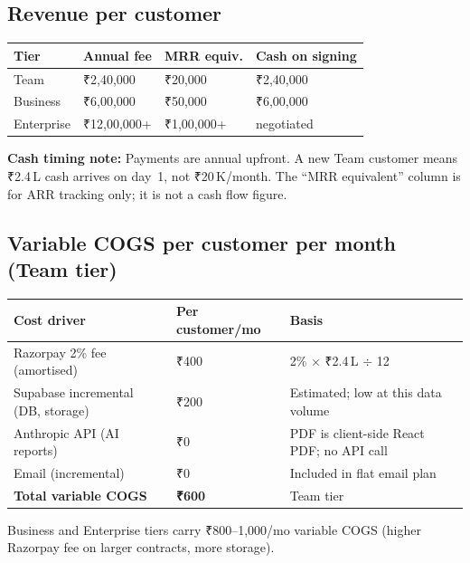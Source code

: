 \documentclass[12pt,a4paper]{article}
\newcommand{\tild}{\raisebox{0.17ex}{$\scriptstyle\sim$}}
\begin{document}
\subsection{Revenue per customer}

\begin{tabular}{@{}L{3cm}R{3.2cm}R{3.2cm}R{4.5cm}@{}}
  \toprule
  \textbf{Tier} & \textbf{Annual fee} & \textbf{MRR equiv.} & \textbf{Cash on signing} \\
  \midrule
  Team       & ₹2,40,000   & ₹20,000    & ₹2,40,000 \\
  Business   & ₹6,00,000   & ₹50,000    & ₹6,00,000 \\
  Enterprise & ₹12,00,000+ & ₹1,00,000+ & negotiated \\
  \bottomrule
\end{tabular}

\vspace{0.5em}
\textbf{Cash timing note:} Payments are annual upfront. A new Team customer
means ₹2.4\,L cash arrives on day~1, not ₹20\,K/month. The ``MRR equivalent''
column is for ARR tracking only; it is not a cash flow figure.

\subsection{Variable COGS per customer per month (Team tier)}

\begin{tabular}{@{}L{7cm}R{3cm}L{5cm}@{}}
  \toprule
  \textbf{Cost driver} & \textbf{Per customer/mo} & \textbf{Basis} \\
  \midrule
  Razorpay 2\% fee (amortised)       & ₹400 & 2\% $\times$ ₹2.4\,L $\div$ 12 \\
  Supabase incremental (DB, storage) & ₹200 & Estimated; low at this data volume \\
  Anthropic API (AI reports)         & ₹0   & PDF is client-side React PDF; no API call \\
  Email (incremental)                & ₹0   & Included in flat email plan \\
  \midrule
  \textbf{Total variable COGS}       & \textbf{₹600} & Team tier \\
  \bottomrule
\end{tabular}

\vspace{0.5em}
Business and Enterprise tiers carry \tild{}₹800--1,000/mo variable COGS
(higher Razorpay fee on larger contracts, more storage).
\end{document}
